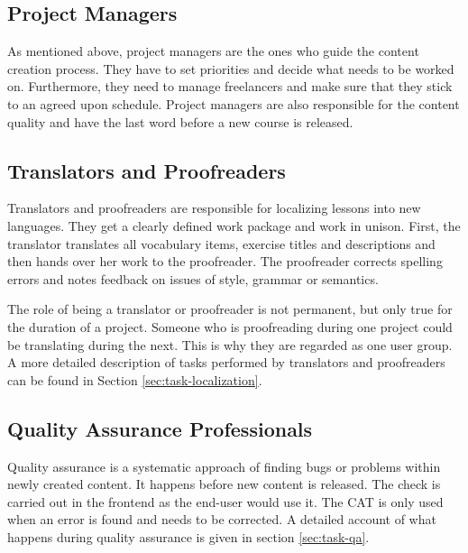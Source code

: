 \subsection{Project Managers}
As mentioned above, project managers are the ones who guide the content creation process. They have to set priorities and decide what needs to be worked on. Furthermore, they need to manage freelancers and make sure that they stick to an agreed upon schedule. Project managers are also responsible for the content quality and have the last word before a new course is released.

\subsection{Translators and Proofreaders}
Translators and proofreaders are responsible for localizing lessons into new languages. They get a clearly defined work package and work in unison. First, the translator translates all vocabulary items, exercise titles and descriptions and then hands over her work to the proofreader. The proofreader corrects spelling errors and notes feedback on issues of style, grammar or semantics.

The role of being a translator or proofreader is not permanent, but only true for the duration of a project. Someone who is proofreading during one project could be translating during the next. This is why they are regarded as one user group. A more detailed description of tasks performed by translators and proofreaders can be found in Section \ref{sec:task-localization}.


\subsection{Quality Assurance Professionals}
Quality assurance is a systematic approach of finding bugs or problems within newly created content. It happens before new content is released. The check is carried out in the frontend as the end-user would use it. The CAT is only used when an error is found and needs to be corrected. A detailed account of what happens during quality assurance is given in section \ref{sec:task-qa}.

